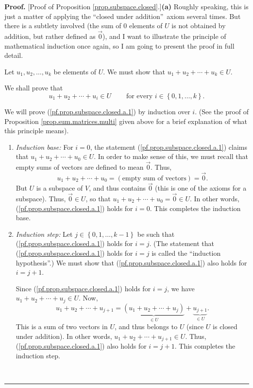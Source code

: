 \documentclass[numbers=enddot,12pt,final,onecolumn,notitlepage]{scrartcl}%
\theoremstyle{definition}
\newenvironment{proof}[1][Proof]{\noindent\textbf{#1.} }{\ \rule{0.5em}{0.5em}}
\begin{document}
\begin{proof}
[Proof of Proposition \ref{prop.subspace.closed}.]\textbf{(a)} Roughly
speaking, this is just a matter of applying the \textquotedblleft closed under
addition\textquotedblright\ axiom several times. But there is a subtlety
involved (the sum of $0$ elements of $U$ is not obtained by addition, but
rather defined as $\overrightarrow{0}$), and I want to illustrate the
principle of mathematical induction once again, so I am going to present the
proof in full detail.

Let $u_{1},u_{2},\ldots,u_{k}$ be elements of $U$. We must show that
$u_{1}+u_{2}+\cdots+u_{k}\in U$.

We shall prove that%
\begin{equation}
u_{1}+u_{2}+\cdots+u_{i}\in U\ \ \ \ \ \ \ \ \ \ \text{for every }i\in\left\{
0,1,\ldots,k\right\}  . \label{pf.prop.subspace.closed.a.1}%
\end{equation}


We will prove (\ref{pf.prop.subspace.closed.a.1}) by induction over $i$. (See
the proof of Proposition \ref{prop.sum.matrices.multi} given above for a brief
explanation of what this principle means).

\begin{enumerate}
\item \textit{Induction base:} For $i=0$, the statement
(\ref{pf.prop.subspace.closed.a.1}) claims that $u_{1}+u_{2}+\cdots+u_{0}\in
U$. In order to make sense of this, we must recall that empty sums of vectors
are defined to mean $\overrightarrow{0}$. Thus,
\[
u_{1}+u_{2}+\cdots+u_{0}=\left(  \text{empty sum of vectors}\right)
=\overrightarrow{0}.
\]
But $U$ is a subspace of $V$, and thus contains $\overrightarrow{0}$ (this is
one of the axioms for a subspace). Thus, $\overrightarrow{0}\in U$, so that
$u_{1}+u_{2}+\cdots+u_{0}=\overrightarrow{0}\in U$. In other words,
(\ref{pf.prop.subspace.closed.a.1}) holds for $i=0$. This completes the
induction base.

\item \textit{Induction step:} Let $j\in\left\{  0,1,\ldots,k-1\right\}  $ be
such that (\ref{pf.prop.subspace.closed.a.1}) holds for $i=j$. (The statement
that (\ref{pf.prop.subspace.closed.a.1}) holds for $i=j$ is called the
\textquotedblleft induction hypothesis\textquotedblright.) We must show that
(\ref{pf.prop.subspace.closed.a.1}) also holds for $i=j+1$.

Since (\ref{pf.prop.subspace.closed.a.1}) holds for $i=j$, we have
$u_{1}+u_{2}+\cdots+u_{j}\in U$. Now,%
\[
u_{1}+u_{2}+\cdots+u_{j+1}=\underbrace{\left(  u_{1}+u_{2}+\cdots
+u_{j}\right)  }_{\in U}+\underbrace{u_{j+1}}_{\in U}.
\]
This is a sum of two vectors in $U$, and thus belongs to $U$ (since $U$ is
closed under addition). In other words, $u_{1}+u_{2}+\cdots+u_{j+1}\in U$.
Thus, (\ref{pf.prop.subspace.closed.a.1}) also holds for $i=j+1$. This
completes the induction step.
\end{enumerate}


\end{proof}
\end{document}
